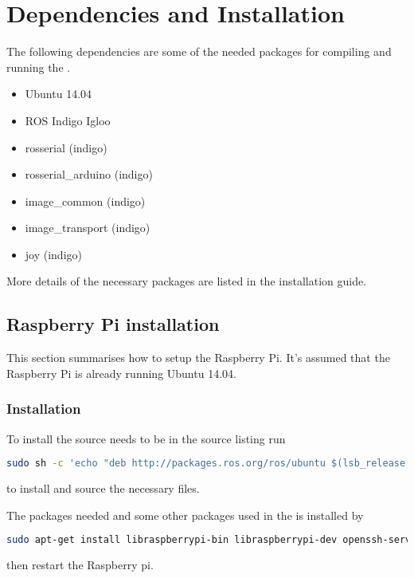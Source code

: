 \chapter{Dependencies and Installation}\label{app:dependencies}
The following dependencies are some of the needed packages for compiling and running the \abbrROV.
\begin{itemize}
    \item Ubuntu 14.04
    \item ROS Indigo Igloo
    \item rosserial (indigo)
    \item rosserial\_arduino (indigo)
    \item image\_common (indigo) 
    \item image\_transport (indigo)
    \item joy (indigo)
\end{itemize}

More details of the necessary packages are listed in the installation guide.

\section{Raspberry Pi installation}
This section summarises how to setup the Raspberry Pi. It's assumed that the Raspberry Pi is already running Ubuntu 14.04.

\subsection{\abbrROS Installation}
To install \abbrROS the \abbrROS source needs to be in the source listing run

\begin{lstlisting}[language=bash]
sudo sh -c 'echo "deb http://packages.ros.org/ros/ubuntu $(lsb_release -sc) main" > /etc/apt/sources.list.d/ros-latest.list' && sudo apt-get install ros-indigo-ros-base -y && sudo rosdep init && rosdep update && echo "source /opt/ros/indigo/setup.bash" >> ~/.bashrc && source ~/.bashrc && sudo apt-get upgrade -y && sudo ln -s /usr /opt/vc
\end{lstlisting}
to install \abbrROS and source the necessary files.

The packages needed and some other packages used in the \abbrROV is installed by
\begin{lstlisting}[language=bash]
sudo apt-get install libraspberrypi-bin libraspberrypi-dev openssh-server build-essential avahi-daemon linux-firmware python-rosinstall ros-indigo-rosserial ros-indigo-rosserial-arduino ros-indigo-image-common ros-indigo-image-transport-plugins git && sudo sh -c 'echo "start_x=1\ngpu_mem=128" >> /boot/config.txt'
\end{lstlisting}
then restart the Raspberry pi.

